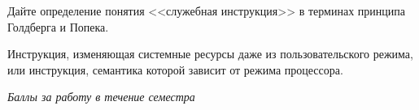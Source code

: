 \documentclass[a4paper, addpoints]{exam}
\begin{document}
\begin{questions}
\question[2] Дайте определение понятия <<служебная инструкция>> в терминах принципа Голдберга и Попека.
\begin{solution}[2cm]
Инструкция, изменяющая системные ресурсы даже из пользовательского режима, или инструкция, семантика которой зависит от режима процессора.
\end{solution}


\bonusquestion \textit{Баллы за работу в течение семестра}

\newpage
\phantom{Blank page}

\end{questions}
\end{document}
